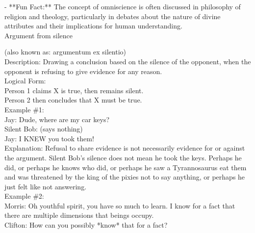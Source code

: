 \documentclass[a4paper,12pt,single,pdftex]{scrartcl}
\begin{document}
    
      - **Fun Fact:** The concept of omniscience is often discussed in philosophy of religion and theology, particularly in debates about the nature of divine attributes and their implications for human understanding.
    \\

  

Argument from silence
    
      (also known as: argumentum ex silentio)
    \\

  
    
      Description: Drawing a conclusion based on the silence of the opponent, when the opponent is refusing to give evidence for any reason.
    \\

    
      Logical Form:
    \\

    
      Person 1 claims X is true, then remains silent.
    \\

    
      Person 2 then concludes that X must be true.
    \\

    
      Example \#1:
    \\

    
      Jay: Dude, where are my car keys?
    \\

    
      Silent Bob: (says nothing)
    \\

    
      Jay: I KNEW you took them!
    \\

    
      Explanation: Refusal to share evidence is not necessarily evidence for or against the argument. Silent Bob’s silence does not mean he took the keys.  Perhaps he did, or perhaps he knows who did, or perhaps he saw a Tyrannosaurus eat them and was threatened by the king of the pixies not to say anything, or perhaps he just felt like not answering. 
    \\

    
      Example \#2:
    \\

    
      Morris: Oh youthful spirit, you have so much to learn.  I know for a fact that there are multiple dimensions that beings occupy.
    \\

    
      Clifton: How can you possibly *know* that for a fact?
    \\
\end{document}
